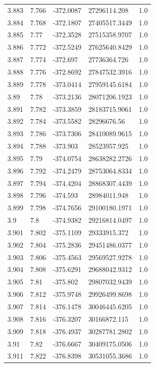 \begin{tabular}{lllll}
3.883 & 7.766 & -372.0087 & 27296114.208 & 1.0 \\
3.884 & 7.768 & -372.1807 & 27405517.3449 & 1.0 \\
3.885 & 7.77 & -372.3528 & 27515358.9707 & 1.0 \\
3.886 & 7.772 & -372.5249 & 27625640.8429 & 1.0 \\
3.887 & 7.774 & -372.697 & 27736364.726 & 1.0 \\
3.888 & 7.776 & -372.8692 & 27847532.3916 & 1.0 \\
3.889 & 7.778 & -373.0414 & 27959145.6184 & 1.0 \\
3.89 & 7.78 & -373.2136 & 28071206.1923 & 1.0 \\
3.891 & 7.782 & -373.3859 & 28183715.9061 & 1.0 \\
3.892 & 7.784 & -373.5582 & 28296676.56 & 1.0 \\
3.893 & 7.786 & -373.7306 & 28410089.9615 & 1.0 \\
3.894 & 7.788 & -373.903 & 28523957.925 & 1.0 \\
3.895 & 7.79 & -374.0754 & 28638282.2726 & 1.0 \\
3.896 & 7.792 & -374.2479 & 28753064.8334 & 1.0 \\
3.897 & 7.794 & -374.4204 & 28868307.4439 & 1.0 \\
3.898 & 7.796 & -374.593 & 28984011.948 & 1.0 \\
3.899 & 7.798 & -374.7656 & 29100180.1971 & 1.0 \\
3.9 & 7.8 & -374.9382 & 29216814.0497 & 1.0 \\
3.901 & 7.802 & -375.1109 & 29333915.372 & 1.0 \\
3.902 & 7.804 & -375.2836 & 29451486.0377 & 1.0 \\
3.903 & 7.806 & -375.4563 & 29569527.9278 & 1.0 \\
3.904 & 7.808 & -375.6291 & 29688042.9312 & 1.0 \\
3.905 & 7.81 & -375.802 & 29807032.9439 & 1.0 \\
3.906 & 7.812 & -375.9748 & 29926499.8698 & 1.0 \\
3.907 & 7.814 & -376.1478 & 30046445.6205 & 1.0 \\
3.908 & 7.816 & -376.3207 & 30166872.115 & 1.0 \\
3.909 & 7.818 & -376.4937 & 30287781.2802 & 1.0 \\
3.91 & 7.82 & -376.6667 & 30409175.0506 & 1.0 \\
3.911 & 7.822 & -376.8398 & 30531055.3686 & 1.0 \\

\end{tabular}
